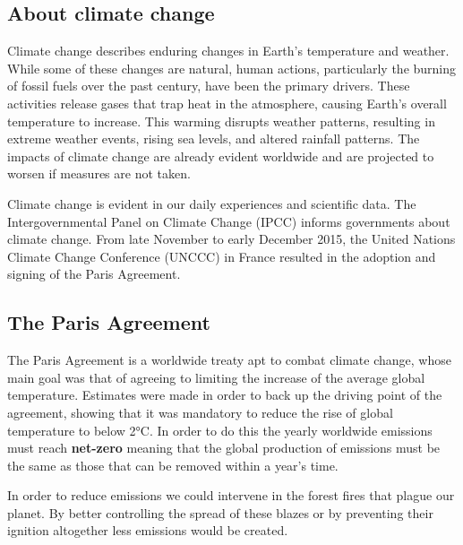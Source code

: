 \documentclass[11pt]{article}
\begin{document}
\subsection{About climate change}
Climate change describes enduring changes in Earth's temperature and weather. While some of these changes are natural, human actions, particularly the burning of fossil fuels over the past century, have been the primary drivers. These activities release gases that trap heat in the atmosphere, causing Earth's overall temperature to increase. This warming disrupts weather patterns, resulting in extreme weather events, rising sea levels, and altered rainfall patterns. The impacts of climate change are already evident worldwide and are projected to worsen if measures are not taken.\par
\vspace{0.5 cm}
Climate change is evident in our daily experiences and scientific data. The Intergovernmental Panel on Climate Change (IPCC) informs governments about climate change. From late November to early December 2015, the United Nations Climate Change Conference (UNCCC) in France resulted in the adoption and signing of the Paris Agreement.\par
\vspace{0.5 cm}

\subsection{The Paris Agreement}
The Paris Agreement is a worldwide treaty apt to combat climate change, whose main goal was that of agreeing to limiting the increase of the average global temperature. Estimates were made in order to back up the driving point of the agreement, showing that it was mandatory to reduce the rise of global temperature to below 2°C. In order to do this the yearly worldwide emissions must reach \textbf{net-zero} meaning that the global production of emissions must be the same as those that can be removed within a year's time. \par 
\vspace{0.5 cm}
In order to reduce emissions we could intervene in the forest fires that plague our planet. By better controlling the spread of these blazes or by preventing their ignition altogether less emissions would be created.  
\vspace{0.5 cm}
\end{document}
